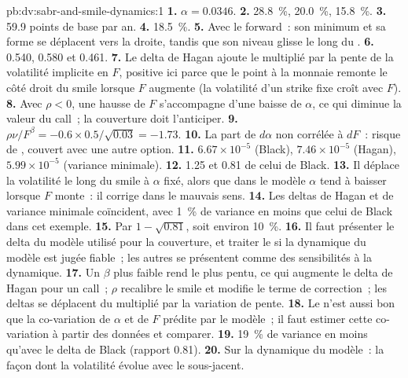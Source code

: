 \begin{solution}{pb:dv:sabr-and-smile-dynamics:1}
\textbf{1.} $\alpha=0.0346$.
\textbf{2.} 28.8~\%, 20.0~\%, 15.8~\%.
\textbf{3.} 59.9 points de base par an.
\textbf{4.} 18.5~\%.
\textbf{5.} Avec le forward~: son minimum et sa forme se déplacent vers la droite, tandis que son niveau glisse le long du .
\textbf{6.} 0.540, 0.580 et 0.461.
\textbf{7.} Le delta de Hagan ajoute le  multiplié par la pente de la volatilité implicite en $F$, positive ici parce que le
point à la monnaie remonte le côté droit du smile lorsque $F$ augmente (la volatilité d'un strike fixe croît avec $F$).
\textbf{8.} Avec $\rho<0$, une hausse de $F$ s'accompagne d'une baisse de $\alpha$, ce qui diminue la valeur du call~; la couverture
doit l'anticiper.
\textbf{9.} $\rho\nu/F^\beta=-0.6\times0.5/\sqrt{0.03}=-1.73$.
\textbf{10.} La part de $d\alpha$ non corrélée à $dF$~: risque de , couvert avec une autre option.
\textbf{11.} $6.67\times10^{-5}$ (Black), $7.46\times10^{-5}$ (Hagan), $5.99\times10^{-5}$ (variance minimale).
\textbf{12.} 1.25 et 0.81 de celui de Black.
\textbf{13.} Il déplace la volatilité le long du smile à $\alpha$ fixé, alors que dans le modèle $\alpha$ tend à baisser lorsque
$F$ monte~: il corrige dans le mauvais sens.
\textbf{14.} Les deltas de Hagan et de variance minimale coïncident, avec 1~\% de variance en moins que celui de Black dans cet exemple.
\textbf{15.} Par $1-\sqrt{0.81}$, soit environ 10~\%.
\textbf{16.} Il faut présenter le delta du modèle utilisé pour la couverture, et traiter le  si la dynamique du modèle
est jugée fiable~; les autres se présentent comme des sensibilités à la dynamique.
\textbf{17.} Un $\beta$ plus faible rend le  plus pentu, ce qui augmente le delta de Hagan pour un call~; $\rho$ recalibre le smile
et modifie le terme de correction~; les deltas se déplacent du  multiplié par la variation de pente.
\textbf{18.} Le  n'est aussi bon que la co-variation de $\alpha$ et de $F$ prédite par le modèle~; il faut
estimer cette co-variation à partir des données et comparer.
\textbf{19.} 19~\% de variance en moins qu'avec le delta de Black (rapport 0.81).
\textbf{20.} Sur la dynamique du modèle~: la façon dont la volatilité évolue avec le sous-jacent.
\end{solution}

